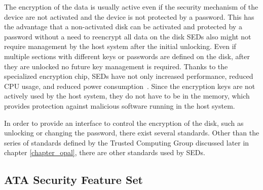 The encryption of the data is usually active even if the security mechanism of the device are not activated and the device is not protected by a password. This has the advantage that a non-activated disk can be activated and protected by a password without a need to reencrypt all data on the disk
SEDs also might not require management by the host system after the initial unlocking. Even if multiple sections with different keys or passwords are defined on the disk, after they are unlocked no future key management is required.
Thanks to the specialized encryption chip, SEDs have not only increased performance, reduced CPU usage, and reduced power consumption~\cite{comparing_the_power}.
Since the encryption keys are not actively used by the host system, they do not have to be in the memory, which provides protection against malicious software running in the host system. 





In order to provide an interface to control the encryption of the disk, such as unlocking or changing the password, there exist several standards. Other than the series of standards defined by the Trusted Computing Group discussed later in chapter \ref{chapter_opal}, there are other standards used by SEDs.


\subsection{ATA Security Feature Set}

